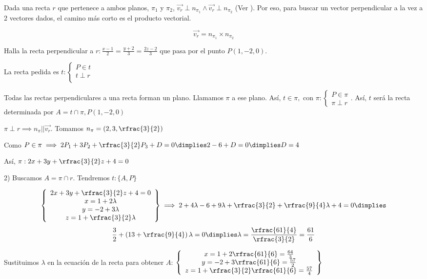 Dada una recta $r$ que pertenece a ambos planos, $\pi_1$ y $\pi_2$, $\vec{v_r}\perp n_{\pi_1} \wedge \vec{v_r}\perp n_{\pi_2}$ (Ver ).
%
Por eso, para buscar un vector perpendicular a la vez a 2 vectores dados, el camino más corto es el producto vectorial.

\[\vec{v_r} = n_{\pi_1}\times n_{\pi_2}\]

\begin{problem}

Halla la recta perpendicular a $r:\frac{x-1}{2} = \frac{y+2}{3} = \frac{2z-2}{3}$ que pasa por el punto $P(1,-2,0)$.

\solution

La recta pedida es $t:\left\{\begin{array}{c}P\in t\\t\perp r\\\end{array}\right.$ 

Todas las rectas perpendiculares a una recta forman un plano. Llamamos $\pi$ a ese plano. Así, $ t \in \pi, \text{ con } \pi:\left\{\begin{array}{c}P\in\pi\\\pi\perp r\end{array}\right.$. Así, $t$ será la recta determinada por $A = t\cap\pi, P(1,-2,0)$

$\pi\perp r\implies n_{\pi} || \vec{v_r}$. Tomamos $n_{\pi}  = \left(2,3,\rfrac{3}{2}\right)$

Como $P\in\pi\implies 2P_1 + 3P_2 +\rfrac{3}{2}P_3 + D = 0 \dimplies 2-6+D = 0 \dimplies D=4$

Así, $\pi: 2x+3y+\rfrac{3}{2}z + 4 = 0$

2) Buscamos $A=\pi\cap r$. Tendremos $t:\{A,P\}$


\[
  \left\{\begin{array}{c}
    2x+3y+\rfrac{3}{2}z + 4 = 0\\
    x = 1 + 2\lambda\\
    y = -2 + 3\lambda\\
    z = 1 + \rfrac{3}{2}\lambda\end{array}\right\} \implies 2+4\lambda - 6 + 9\lambda + \rfrac{3}{2} + \rfrac{9}{4}\lambda + 4 = 0 \dimplies 
\]
\[
  \frac{3}{2}+\left(13+\rfrac{9}{4}\right)\lambda = 0 \dimplies \lambda = \frac{\rfrac{61}{4}}{\rfrac{3}{2}} = \frac{61}{6}
\]

Sustituimos $\lambda$ en la ecuación de la recta para obtener $A$:
$\left\{\begin{array}{c}
    x = 1 + 2\rfrac{61}{6} = \frac{64}{3}\\
    y = -2 + 3\rfrac{61}{6} = \frac{57}{2}\\
    z = 1 + \rfrac{3}{2}\rfrac{61}{6} = \frac{57}{4}
\end{array}\right\}$



\end{problem}
